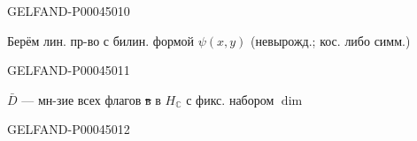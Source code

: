 \begin{GelfandAdjacentEvidence}{GELFAND-P000450}{10}


Берём лин. пр-во  с билин. формой $\psi(x,y)$
(невырожд.; кос. либо симм.)
\end{GelfandAdjacentEvidence}
\begin{GelfandAdjacentEvidence}{GELFAND-P000450}{11}


$\bar D$ — мн-зие всех флагов \sout{в} в $H_{\mathbb C}$
с фикс. набором $\dim$
\end{GelfandAdjacentEvidence}
\begin{GelfandAdjacentEvidence}{GELFAND-P000450}{12}

\end{GelfandAdjacentEvidence}



